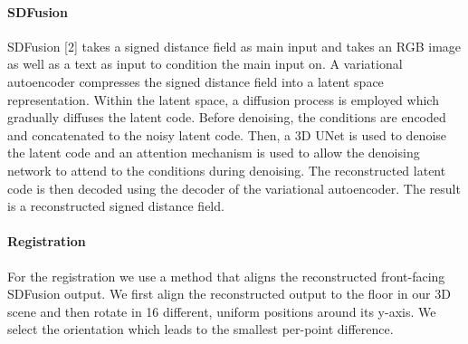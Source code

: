\paragraph{SDFusion}
SDFusion [2] takes a signed distance field as main input and takes an RGB image as well as a text as input to condition the main input on.
A variational autoencoder compresses the signed distance field into a latent space representation.
Within the latent space, a diffusion process is employed which gradually diffuses the latent code.
Before denoising, the conditions are encoded and concatenated to the noisy latent code.
Then, a 3D UNet is used to denoise the latent code and an attention mechanism is used to allow the denoising network to attend to the conditions during denoising.
The reconstructed latent code is then decoded using the decoder of the variational autoencoder. The result is a reconstructed signed distance field.

\paragraph{Registration}
For the registration we use a method that aligns the reconstructed front-facing SDFusion output.
We first align the reconstructed output to the floor in our 3D scene and then rotate in 16 different, uniform positions around its y-axis.
We select the orientation which leads to the smallest per-point difference.
